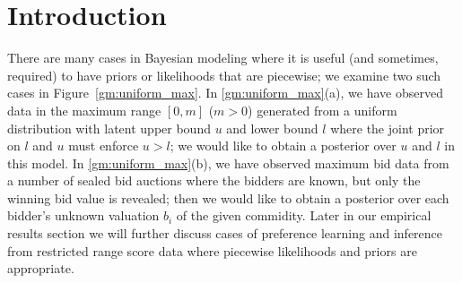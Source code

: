 \documentclass[letterpaper]{article}
\renewcommand{\-}{\text{-}}
\begin{document}

\section{Introduction}

\label{sec:intro}

There are many cases in Bayesian modeling where it is useful (and
sometimes, required) to have priors or likelihoods that are piecewise;
we examine two such cases in Figure~\ref{gm:uniform_max}.  In
\ref{gm:uniform_max}(a), we have observed data in the maximum range
$[0,m]$ ($m > 0$) generated from a uniform distribution with latent
upper bound $u$ and lower bound $l$ where the joint prior on $l$ and
$u$ must enforce $u > l$; we would like to obtain a posterior over $u$
and $l$ in this model.  In \ref{gm:uniform_max}(b), we have observed
maximum bid data from a number of sealed bid auctions where the
bidders are known, but only the winning bid value is revealed; then we
would like to obtain a posterior over each bidder's unknown valuation
$b_i$ of the given commidity.  Later in our empirical results section
we will further discuss cases of preference learning and inference
from restricted range score data where piecewise likelihoods and
priors are appropriate.
\end{document}
